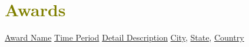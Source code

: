 
\section{\textcolor{olive}{\textbf{Awards}}}

    \resumeSubHeadingListStart
		
    \resumeSubheading
        {\underline{Award Name}}
        {\underline{Time Period}}
        {\underline{Detail Description}}
        {\textcolor{gray}{\footnotesize{\faMapMarker}} \underline{City}, \underline{State}, \underline{Country}}
	\resumeSubHeadingListEnd
